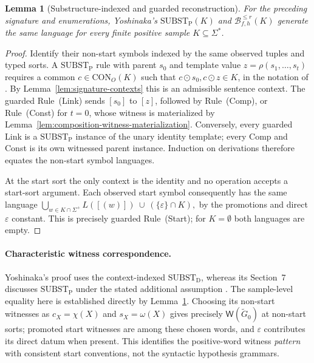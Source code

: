 \documentclass[11pt]{article}
\numberwithin{equation}{section}
\theoremstyle{plain}
\newtheorem{lemma}[theorem]{Lemma}
\theoremstyle{definition}
\theoremstyle{remark}
\newcommand{\Wit}{\mathsf{W}}
\newcommand{\eps}{\varepsilon}
\theoremstyle{plain}
\begin{document}
\begin{lemma}[Substructure-indexed and guarded reconstruction]
\label{lem:substp}
For the preceding signature and enumerations,
Yoshinaka's $\mathrm{SUBST}_{\mathrm P}(K)$
and $\mathcal B^{\le r}_{f,h}(K)$ generate
the same language for every finite
positive sample $K\subseteq\Sigma^*$.
\end{lemma}

\begin{proof}
Identify their non-start symbols indexed
by the same observed tuples and typed sorts.
A $\mathrm{SUBST}_{\mathrm P}$ rule
with parent $s_0$ and template value
$z=\rho(s_1,\ldots,s_t)$ requires a
common $c\in\mathrm{CON}_O(K)$ such that
$c\odot s_0,c\odot z\in K$,
in the notation of
\cite{Yoshinaka2015General}. By Lemma~\ref{lem:signature-contexts}
this is an admissible sentence context.
The guarded Rule~(Link) sends $[s_0]$
to $[z]$, followed by Rule~(Comp), or
Rule~(Const) for $t=0$, whose witness
is materialized by
Lemma~\ref{lem:composition-witness-materialization}.
Conversely, every guarded Link is a
$\mathrm{SUBST}_{\mathrm P}$ instance of
the unary identity template; every Comp
and Const is its own witnessed parent
instance. Induction on derivations
therefore equates the non-start
symbol languages.

At the start sort the only context is
the identity and no operation accepts
a start-sort argument. Each observed
start symbol consequently has the
same language
\(\bigcup_{w\in K\cap\Sigma^+}L([(w)]) \ \cup\ (\{\eps\}\cap K),\)
by the promotions and direct $\eps$
constant. This is precisely guarded
Rule~(Start); for $K=\emptyset$ both
languages are empty.
\end{proof}

\paragraph{Characteristic witness correspondence.}
Yoshinaka's proof uses the context-indexed
$\mathrm{SUBST}_{\mathrm D}$, whereas its
Section~7 discusses $\mathrm{SUBST}_{\mathrm P}$
under the stated additional assumption
\cite{Yoshinaka2015General}.
The sample-level equality here is established
directly by Lemma~\ref{lem:substp}.
Choosing its non-start witnesses as
$c_X=\chi(X)$ and $s_X=\omega(X)$
gives precisely $\Wit(\widetilde G_0)$
at non-start sorts; promoted start
witnesses are among these chosen words,
and $\eps$ contributes its direct
datum when present. This identifies
the positive-word witness \emph{pattern}
with consistent start conventions,
not the syntactic hypothesis grammars.
\end{document}
